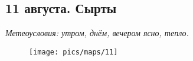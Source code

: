 \subsection{11 августа. Сырты}
\textit{Метеоусловия: утром, днём, вечером ясно, тепло.}


\begin{figure}[h!]
	\centering
	\texttt{[image: pics/maps/11]}
	\label{fig:11}
\end{figure}